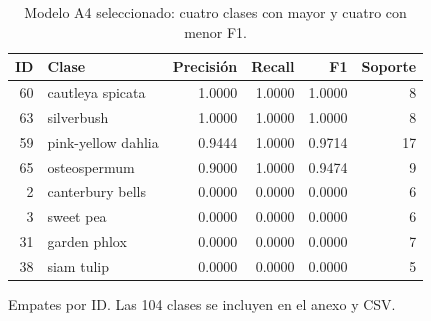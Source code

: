 \begin{table}[htbp]
\centering
\small
\caption{Modelo A4 seleccionado: cuatro clases con mayor y cuatro con menor F1.}
\label{tab:clases-resumen}
\begin{tabular}{rlrrrr}
\toprule
ID & Clase & Precisión & Recall & F1 & Soporte \\
\midrule
60 & cautleya spicata & 1.0000 & 1.0000 & 1.0000 & 8 \\
63 & silverbush & 1.0000 & 1.0000 & 1.0000 & 8 \\
59 & pink-yellow dahlia & 0.9444 & 1.0000 & 0.9714 & 17 \\
65 & osteospermum & 0.9000 & 1.0000 & 0.9474 & 9 \\
2 & canterbury bells & 0.0000 & 0.0000 & 0.0000 & 6 \\
3 & sweet pea & 0.0000 & 0.0000 & 0.0000 & 6 \\
31 & garden phlox & 0.0000 & 0.0000 & 0.0000 & 7 \\
38 & siam tulip & 0.0000 & 0.0000 & 0.0000 & 5 \\
\bottomrule
\end{tabular}
\par\smallskip
\parbox{0.97\textwidth}{\footnotesize Empates por ID. Las 104 clases se incluyen en el anexo y CSV.}
\end{table}
